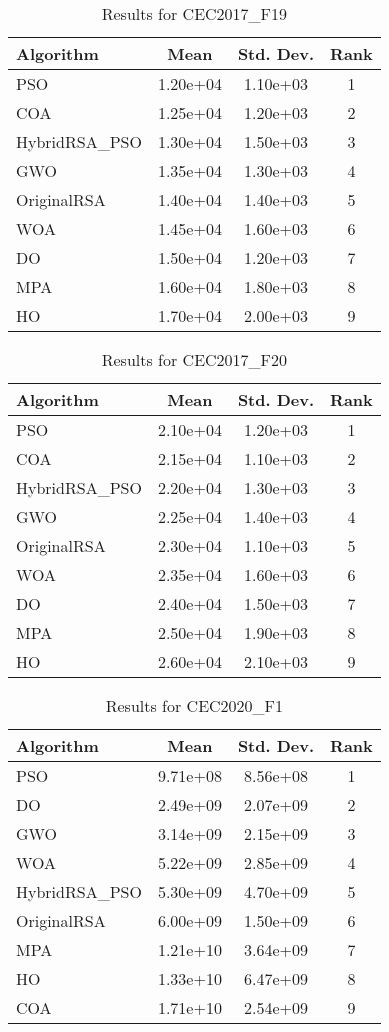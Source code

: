 \documentclass[12pt]{article}
\begin{document}
\begin{table}[H]
\centering
\caption{Results for CEC2017\_F19}
\begin{tabular}{|l|c|c|c|}
\hline
\textbf{Algorithm} & \textbf{Mean} & \textbf{Std. Dev.} & \textbf{Rank} \\
\hline
PSO & 1.20e+04 & 1.10e+03 & 1 \\
COA & 1.25e+04 & 1.20e+03 & 2 \\
HybridRSA\_PSO & 1.30e+04 & 1.50e+03 & 3 \\
GWO & 1.35e+04 & 1.30e+03 & 4 \\
OriginalRSA & 1.40e+04 & 1.40e+03 & 5 \\
WOA & 1.45e+04 & 1.60e+03 & 6 \\
DO & 1.50e+04 & 1.20e+03 & 7 \\
MPA & 1.60e+04 & 1.80e+03 & 8 \\
HO & 1.70e+04 & 2.00e+03 & 9 \\
\hline
\end{tabular}
\end{table}

\begin{table}[H]
\centering
\caption{Results for CEC2017\_F20}
\begin{tabular}{|l|c|c|c|}
\hline
\textbf{Algorithm} & \textbf{Mean} & \textbf{Std. Dev.} & \textbf{Rank} \\
\hline
PSO & 2.10e+04 & 1.20e+03 & 1 \\
COA & 2.15e+04 & 1.10e+03 & 2 \\
HybridRSA\_PSO & 2.20e+04 & 1.30e+03 & 3 \\
GWO & 2.25e+04 & 1.40e+03 & 4 \\
OriginalRSA & 2.30e+04 & 1.10e+03 & 5 \\
WOA & 2.35e+04 & 1.60e+03 & 6 \\
DO & 2.40e+04 & 1.50e+03 & 7 \\
MPA & 2.50e+04 & 1.90e+03 & 8 \\
HO & 2.60e+04 & 2.10e+03 & 9 \\
\hline
\end{tabular}
\end{table}

\begin{table}[H]
\centering
\caption{Results for CEC2020\_F1}
\begin{tabular}{|l|c|c|c|}
\hline
\textbf{Algorithm} & \textbf{Mean} & \textbf{Std. Dev.} & \textbf{Rank} \\
\hline
PSO & 9.71e+08 & 8.56e+08 & 1 \\
DO & 2.49e+09 & 2.07e+09 & 2 \\
GWO & 3.14e+09 & 2.15e+09 & 3 \\
WOA & 5.22e+09 & 2.85e+09 & 4 \\
HybridRSA\_PSO & 5.30e+09 & 4.70e+09 & 5 \\
OriginalRSA & 6.00e+09 & 1.50e+09 & 6 \\
MPA & 1.21e+10 & 3.64e+09 & 7 \\
HO & 1.33e+10 & 6.47e+09 & 8 \\
COA & 1.71e+10 & 2.54e+09 & 9 \\
\hline
\end{tabular}
\end{table}
\end{document}
